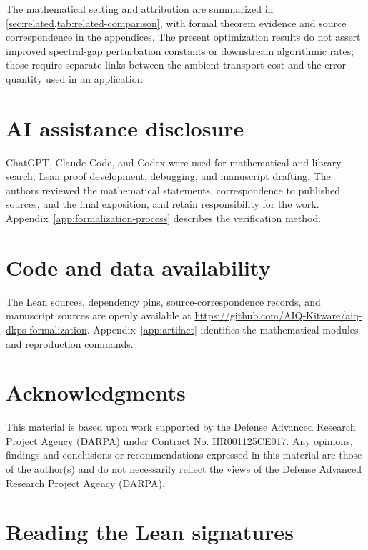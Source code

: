 \documentclass[11pt]{article}
\begin{document}
The mathematical setting and attribution are summarized in
\cref{sec:related,tab:related-comparison}, with formal theorem evidence
and source correspondence in the appendices.  The present optimization
results do not assert improved spectral-gap perturbation constants or
downstream algorithmic rates; those require separate links between the
ambient transport cost and the error quantity used in an application.

\section*{AI assistance disclosure}
ChatGPT, Claude Code, and Codex were used for mathematical and library search,
Lean proof development, debugging, and manuscript drafting. The authors
reviewed the mathematical statements, correspondence to published sources,
and the final exposition, and retain responsibility for the work.
Appendix~\ref{app:formalization-process} describes the verification method.

\section*{Code and data availability}
The Lean sources, dependency pins, source-correspondence records, and manuscript
sources are openly available at
\url{https://github.com/AIQ-Kitware/aiq-dkps-formalization}.
Appendix~\ref{app:artifact} identifies the mathematical modules and reproduction
commands.

\section*{Acknowledgments}

This material is based upon work supported by the Defense Advanced Research
Project Agency (DARPA) under Contract No. HR001125CE017. Any opinions, findings
and conclusions or recommendations expressed in this material are those of the
author(s) and do not necessarily reflect the views of the Defense Advanced
Research Project Agency (DARPA).




\clearpage
\appendix



\section{Reading the Lean signatures}
\label{app:lean-guide}
\label{app:reading-lean}
\end{document}
